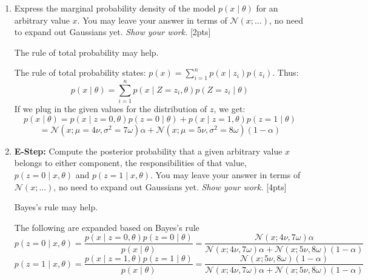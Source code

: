 \begin{enumerate}[label=\alph*.]
    \item Express the marginal probability density of the model $p(x\mid\theta)$ for an arbitrary value $x$. You may leave your answer in terms of $\mathcal{N}(x; \dots)$, no need to expand out Gaussians yet. \emph{Show your work.} [2pts]
    \begin{hintbox}
        The rule of total probability may help. %
    \end{hintbox}

    The rule of total probability states: $p(x) = \sum_{i=1}^n p(x\mid z_i)p(z_i)$. Thus: $$ p(x\mid\theta) = \sum_{i=1}^n p(x\mid Z=z_i, \theta)p(Z=z_i \mid \theta)$$
    If we plug in the given values for the distribution of $z$, we get:
    $$p(x\mid\theta) = p(x\mid z=0, \theta)p(z=0 \mid \theta) + p(x\mid z=1, \theta)p(z=1 \mid \theta)$$
    $$= \boxed{\mathcal{N}(x; \mu=4\nu, \sigma^2=7\omega) \alpha + \mathcal{N}(x; \mu=5\nu, \sigma^2=8\omega) (1-\alpha)}$$

    \item \textbf{E-Step:} Compute the posterior probability that a given arbitrary value $x$ belongs to either component, the responsibilities of that value, $p(z=0\mid x,\theta)$ and $p(z=1\mid x,\theta)$. You may leave your answer in terms of $\mathcal{N}(x; \dots)$, no need to expand out Gaussians yet. \emph{Show your work.} [4pts]
    \begin{hintbox}
        Bayes's rule may help. %
    \end{hintbox}

    The following are expanded based on Bayes's rule
    $$p(z=0\mid x,\theta) = \frac{p(x\mid z=0, \theta)p(z=0\mid\theta)}{p(x\mid\theta)} = \frac{\mathcal{N}(x; 4\nu, 7\omega)\alpha}{\mathcal{N}(x; 4\nu, 7\omega) \alpha + \mathcal{N}(x; 5\nu, 8\omega) (1-\alpha)}$$
    $$p(z=1\mid x,\theta) = \frac{p(x\mid z=1, \theta)p(z=1\mid\theta)}{p(x\mid\theta)} = \frac{\mathcal{N}(x; 5\nu, 8\omega)(1-\alpha)}{\mathcal{N}(x; 4\nu, 7\omega) \alpha + \mathcal{N}(x; 5\nu, 8\omega) (1-\alpha)}$$


\end{enumerate}
